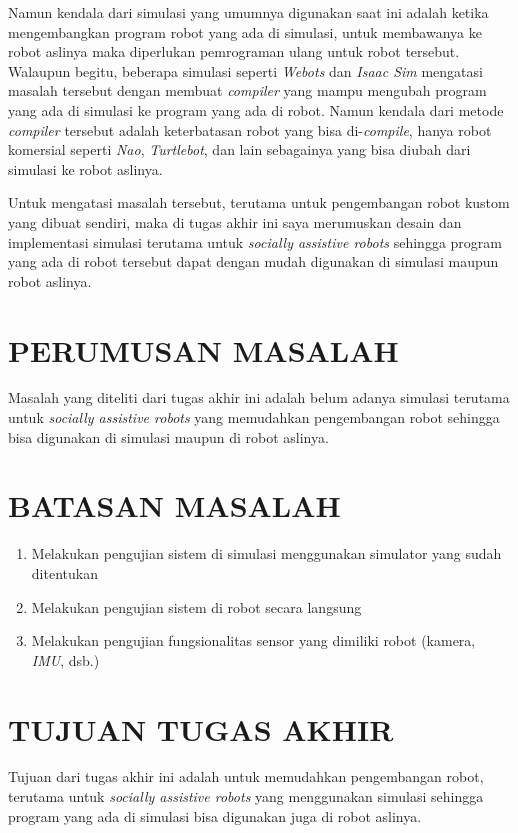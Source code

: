 Namun kendala dari simulasi yang umumnya digunakan saat ini adalah ketika mengembangkan program robot yang ada di simulasi, untuk membawanya ke robot aslinya maka diperlukan pemrograman ulang untuk robot tersebut.
Walaupun begitu, beberapa simulasi seperti \emph{Webots} dan \emph{Isaac Sim} mengatasi masalah tersebut dengan membuat \emph{compiler} yang mampu mengubah program yang ada di simulasi ke program yang ada di robot.
Namun kendala dari metode \emph{compiler} tersebut adalah keterbatasan robot yang bisa di-\emph{compile}, hanya robot komersial seperti \emph{Nao}, \emph{Turtlebot}, dan lain sebagainya yang bisa diubah dari simulasi ke robot aslinya.

Untuk mengatasi masalah tersebut, terutama untuk pengembangan robot kustom yang dibuat sendiri, maka di tugas akhir ini saya merumuskan desain dan implementasi simulasi terutama untuk \emph{socially assistive robots} sehingga program yang ada di robot tersebut dapat dengan mudah digunakan di simulasi maupun robot aslinya.

\section{PERUMUSAN MASALAH}

Masalah yang diteliti dari tugas akhir ini adalah belum adanya simulasi terutama untuk \emph{socially assistive robots} yang memudahkan pengembangan robot sehingga bisa digunakan di simulasi maupun di robot aslinya.

\section{BATASAN MASALAH}

\begin{enumerate}[nolistsep]
  \item Melakukan pengujian sistem di simulasi menggunakan simulator yang sudah ditentukan
  \item Melakukan pengujian sistem di robot secara langsung
  \item Melakukan pengujian fungsionalitas sensor yang dimiliki robot (kamera, \emph{IMU}, dsb.)
\end{enumerate}

\section{TUJUAN TUGAS AKHIR}

Tujuan dari tugas akhir ini adalah untuk memudahkan pengembangan robot, terutama untuk \emph{socially assistive robots} yang menggunakan simulasi sehingga program yang ada di simulasi bisa digunakan juga di robot aslinya.